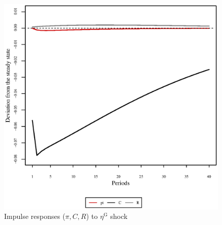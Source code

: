 \pagebreak

\begin{figure}[h]
\centering
\begin{minipage}{0.5\textwidth}
\vspace*{-3em}
\centering
\includegraphics[width=0.99\textwidth, scale=0.55]{plots/plot_105.eps}
\caption{Impulse responses ($\pi, C, R$) to $\eta^{\mathrm{G}}$ shock}
\end{minipage}
\end{figure}
